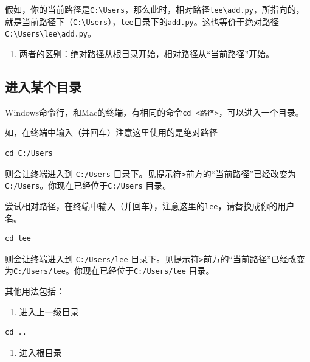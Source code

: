 \documentclass[
]{book}
\providecommand{\tightlist}{%
  \setlength{\itemsep}{0pt}\setlength{\parskip}{0pt}}
\begin{document}
假如，你的当前路径是\texttt{C:\textbackslash{}Users}，那么此时，相对路径\texttt{lee\textbackslash{}add.py}，所指向的，就是当前路径下（\texttt{C:\textbackslash{}Users}），\texttt{lee}目录下的\texttt{add.py}。这也等价于绝对路径\texttt{C:\textbackslash{}Users\textbackslash{}lee\textbackslash{}add.py}。

\begin{enumerate}
\def\labelenumi{\arabic{enumi}.}
\setcounter{enumi}{2}
\tightlist
\item
  两者的区别：绝对路径从根目录开始，相对路径从``当前路径''开始。
\end{enumerate}

\hypertarget{ux8fdbux5165ux67d0ux4e2aux76eeux5f55}{%
\subsection{进入某个目录}\label{ux8fdbux5165ux67d0ux4e2aux76eeux5f55}}

Windows命令行，和Mac的终端，有相同的命令\texttt{cd\ \textless{}路径\textgreater{}}，可以进入一个目录。

如，在终端中输入（并回车）注意这里使用的是绝对路径

\begin{verbatim}
cd C:/Users 
\end{verbatim}

则会让终端进入到 \texttt{C:/Users} 目录下。见提示符\texttt{\textgreater{}}前方的``当前路径''已经改变为\texttt{C:/Users}。你现在已经位于\texttt{C:/Users} 目录。

尝试相对路径，在终端中输入（并回车），注意这里的\texttt{lee}，请替换成你的用户名。

\begin{verbatim}
cd lee
\end{verbatim}

则会让终端进入到 \texttt{C:/Users/lee} 目录下。见提示符\texttt{\textgreater{}}前方的``当前路径''已经改变为\texttt{C:/Users/lee}。你现在已经位于\texttt{C:/Users/lee} 目录。

其他用法包括：

\begin{enumerate}
\def\labelenumi{\arabic{enumi}.}
\tightlist
\item
  进入上一级目录
\end{enumerate}

\begin{verbatim}
cd ..
\end{verbatim}

\begin{enumerate}
\def\labelenumi{\arabic{enumi}.}
\setcounter{enumi}{1}
\tightlist
\item
  进入根目录
\end{enumerate}
\end{document}
